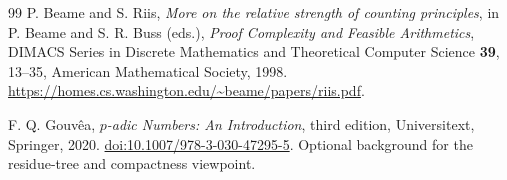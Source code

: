\begin{thebibliography}{99}
P. Beame and S. Riis, \emph{More on the relative strength of counting
principles}, in P. Beame and S. R. Buss (eds.), \emph{Proof Complexity
and Feasible Arithmetics}, DIMACS Series in Discrete Mathematics and
Theoretical Computer Science \textbf{39}, 13--35,
American Mathematical Society, 1998.
\url{https://homes.cs.washington.edu/~beame/papers/riis.pdf}.

F. Q. Gouv\^ea, \emph{$p$-adic Numbers: An Introduction}, third edition,
Universitext, Springer, 2020.
\href{https://doi.org/10.1007/978-3-030-47295-5}{doi:10.1007/978-3-030-47295-5}.
Optional background for the residue-tree and compactness viewpoint.

\end{thebibliography}
